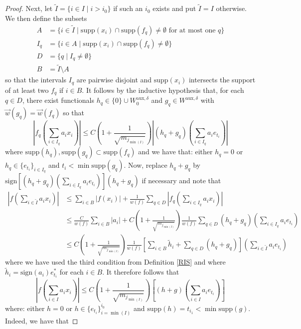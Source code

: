 \documentclass[12pt,a4paper]{amsart}
\newcommand{\bes}{\begin{equation*}}
\newcommand{\ees}{\end{equation*}}
\newcommand{\supp}{\text{supp}}
\theoremstyle{definition}
\theoremstyle{plain}
\begin{document}
\begin{proof}
Next, let $\tilde{I}=\{i\in I \mid i>i_{0}\}$ if such an $i_{0}$ exists and put $\tilde{I}=I$ otherwise. We then define the subsets
\begin{align*}
A&=\{ i\in\tilde{I} \mid \supp(x_{i})\cap\supp(f_{q})\neq\emptyset \text{ for at most one }q\} \\ I_{q}&=\{ i\in A \mid \supp(x_{i})\cap\supp(f_{q})\neq\emptyset\} \\ D&=\{q\mid I_{q}\neq\emptyset\} \\ B&=\tilde{I}\setminus A \end{align*}
so that the intervals $I_{q}$ are pairwise disjoint and $\supp(x_{i})$ intersects the support of at least two $f_{q}$ if $i\in B$. It follows by the inductive hypothesis that, for each $q\in D$, there exist functionals $h_{q}\in \{0\}\cup W^{\text{aux},\delta}_{0}$ and $g_{q}\in W^{\text{aux},\delta}$ with $\vec w(g_{q})=\vec w(f_{q})$ so that 
\bes \left\vert f_{q}\left(\sum_{i\in I_{q}}a_{i}x_{i}\right)\right\vert\leq  C\left(1+\frac{1}{\sqrt{m_{j_{\min(I)}}}}\right)\left\vert (h_{q}+g_{q})\left(\sum_{i\in I_{q}}a_{i}e_{t_{i}}\right)\right\vert \ees
where $\supp(h_{q}),\supp(g_{q})\subset\supp(f_{q})$ and we have that: either $h_{q}=0$ or $h_{q}\in\{e_{t_{i}}\}_{i\in I_{q}}$ and $t_{i}<\min\supp(g_{q})$. Now, replace $h_{q}+g_{q}$ by $\text{sign}\left[(h_{q}+g_{q})\left(\sum_{i\in I_{q}}a_{i}e_{t_{i}}\right)\right](h_{q}+g_{q})$ if necessary and note that
\begin{align*} \left\vert f\left(\sum_{i\in\tilde{I}}a_{i}x_{i}\right)\right\vert &\leq \sum_{i\in B}|f(x_{i})|+\frac{1}{w(f)}\sum_{q\in D}\left\vert f_{q}\left(\sum_{i\in I_{q}}a_{i}x_{i}\right)\right\vert  \\ &\leq\frac{C}{w(f)}\sum_{i\in B}|a_{i}|+C\left(1+\frac{1}{\sqrt{m_{j_{\min(I)}}}}\right)\frac{1}{w(f)}\sum_{q\in D}(h_{q}+g_{q})\left(\sum_{i\in I_{q}}a_{i}e_{t_{i}}\right) \\ &\leq C\left(1+\frac{1}{\sqrt{m_{j_{\min(I)}}}}\right)\frac{1}{w(f)}\left[\sum_{i\in B}\tilde{h}_{i}+\sum_{q\in D}(h_{q}+g_{q}) \right]\left(\sum_{i\in\tilde{I}}a_{i}e_{t_{i}}\right)\end{align*}
where we have used the third condition from Definition \ref{RIS} and where $\tilde{h}_{i}=\text{sign}(a_{i})e_{t_{i}}^{*}$ for each $i\in B$. It therefore follows that
\bes \left\vert f\left(\sum_{i\in I}a_{i}x_{i}\right)\right\vert \leq C\left(1+\frac{1}{\sqrt{m_{j_{\min(I)}}}}\right)\left[(h+g)\left(\sum_{i\in I}a_{i}e_{t_{i}}\right)\right] \ees
where: either $h=0$ or $h\in\{e_{t_{i}}\}_{i=\min(I)}^{i_{0}}$ and $\supp(h)=t_{i_{1}}<\min\supp(g)$. Indeed, we have that

\end{proof}
\end{document}
